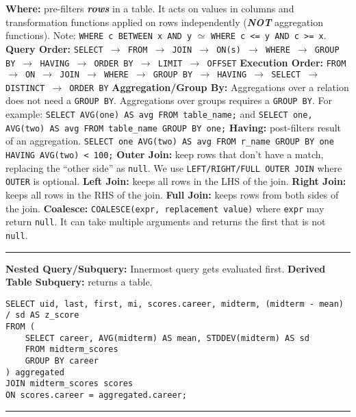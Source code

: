 \documentclass{report}
\renewcommand{\bf}[1]{\textbf{{#1}}}
\renewcommand{\tt}[1]{\texttt{{#1}}}
\newcommand{\ib}[1]{\textit{\textbf{{#1}}}}
\begin{document}
\bf{Where:} pre-filters \ib{rows} in a table. It acts on values in columns and transformation
functions applied on rows independently (\ib{NOT} aggregation functions). Note: \tt{WHERE c
BETWEEN x AND y} $\simeq$ \tt{WHERE c <= y AND c >= x}.
\hfil \newline
\bf{Query Order:} \tt{SELECT $\to$ FROM $\to$ JOIN $\to$ ON(s) $\to$ WHERE $\to$ GROUP BY $\to$
HAVING $\to$ ORDER BY $\to$ LIMIT $\to$ OFFSET}
\bf{Execution Order:} \tt{FROM $\to$ ON $\to$ JOIN $\to$ WHERE $\to$ GROUP BY $\to$ HAVING $\to$
SELECT $\to$ DISTINCT $\to$ ORDER BY}
\newpage
{}
\bf{Aggregation/Group By:} Aggregations over a relation does not need a \tt{GROUP BY}.
Aggregations over groups requires a \tt{GROUP BY}. For example:
\tt{SELECT AVG(one) AS avg FROM table\_name;} and \tt{SELECT one, AVG(two) AS avg FROM
table\_name GROUP BY one;}
\hfil \newline
\bf{Having:} post-filters result of an aggregation. \tt{SELECT one AVG(two) AS avg FROM
r\_name GROUP BY one HAVING AVG(two) < 100;}
\hfil \newline
\bf{Outer Join:} keep rows that don't have a match, replacing the ``other side'' as \tt{null}.
We use \tt{LEFT/RIGHT/FULL OUTER JOIN} where \tt{OUTER} is optional. 
\hfil \newline
\bf{Left Join:} keeps all rows in the LHS of the join. 
\hfil \newline
\bf{Right Join:} keeps all rows in the RHS of the join. 
\hfil \newline
\bf{Full Join:} keeps rows from both sides of the join.
\hfil \newline
\bf{Coalesce:} \tt{COALESCE(expr, replacement value)} where \tt{expr} may return \tt{null}. It can
take multiple arguments and returns the first that is not \tt{null}.
\hfil \newline
\vspace{-0.8em}
\hrule
\vspace{0.2em}

\bf{Nested Query/Subquery:} Innermost query gets evaluated first.
\hfil \newline
\bf{Derived Table Subquery:} returns a table.
\vspace{-1em}
\begin{verbatim}
SELECT uid, last, first, mi, scores.career, midterm, (midterm - mean) / sd AS z_score
FROM (
    SELECT career, AVG(midterm) AS mean, STDDEV(midterm) AS sd
    FROM midterm_scores
    GROUP BY career
) aggregated
JOIN midterm_scores scores
ON scores.career = aggregated.career;
\end{verbatim}
\vspace{-0.5em}
\hrule
\vspace{0.2em}
\end{document}
